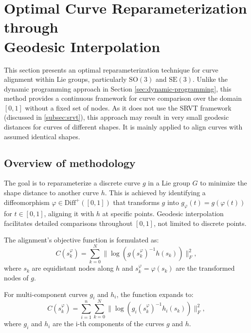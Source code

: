 \FloatBarrier
\section[Optimal Curve Reparameterization through Geodesic Interpolation]{Optimal Curve Reparameterization through \\ Geodesic Interpolation}
\label{sec:optimal-curve-reparameterization}

This section presents an optimal reparameterization technique for curve alignment within Lie groups, particularly \(\mathrm{SO}(3)\) and \(\mathrm{SE}(3)\). Unlike the dynamic programming approach in Section \ref{sec:dynamic-programming}, this method provides a continuous framework for curve comparison over the domain \([0,1]\) without a fixed set of nodes. As it does not use the SRVT framework (discussed in \ref{subsec:srvt}), this approach may result in very small geodesic distances for curves of different shapes. It is mainly applied to align curves with assumed identical shapes.

\subsection{Overview of methodology}
\label{subsec:methodology-overview-geodesic-interpolation}

The goal is to reparameterize a discrete curve \(g\) in a Lie group \(G\) to minimize the shape distance to another curve \(h\). This is achieved by identifying a diffeomorphism \(\varphi \in \mathrm{Diff}^+([0,1])\) that transforms \(g\) into \(g_\varphi(t) = g(\varphi(t))\) for \(t \in [0,1]\), aligning it with \(h\) at specific points. Geodesic interpolation facilitates detailed comparisons throughout \([0,1]\), not limited to discrete points.

The alignment's objective function is formulated as:
\begin{equation}
    C(s_k^\varphi) = \sum_{k=0}^N \| \log(g(s_k^\varphi)^{-1} h(s_k)) \|_F^2,
    \label{eq:cost-function-geodesic-interpolation}
\end{equation}
where \(s_k\) are equidistant nodes along \(h\) and \(s_k^\varphi = \varphi(s_k)\) are the transformed nodes of \(g\).

For multi-component curves \(g_i\) and \(h_i\), the function expands to:
\begin{equation}
    C(s_k^\varphi) = \sum_{i=1}^n \sum_{k=0}^N \| \log(g_i(s_k^\varphi)^{-1} h_i(s_k)) \|_F^2,
    \label{eq:cost-function-geodesic-interpolation-cartesian}
\end{equation}
where \(g_i\) and \(h_i\) are the i-th components of the curves \(g\) and \(h\).

